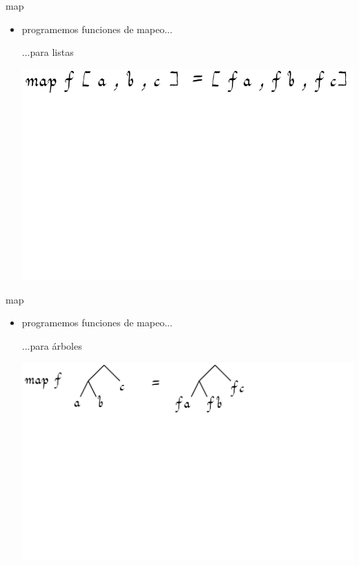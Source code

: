 \documentclass[9pt]{beamer}
\begin{document}
\begin{frame}{map}
  \begin{itemize}
  \item programemos funciones de mapeo...
    \begin{block}{...para listas}\end{block}
    \vspace{1cm}
    \begin{center}\hspace{-2cm}\includegraphics[scale=0.5]{img/maplist}\end{center}
  \end{itemize}
\end{frame}

\begin{frame}{map}
  \begin{itemize}
  \item programemos funciones de mapeo...
    \begin{block}{...para árboles}\end{block}
    \vspace{1cm}
    \begin{center}\includegraphics[scale=0.5]{img/maptree}\end{center}
  \end{itemize}
\end{frame}
\end{document}
